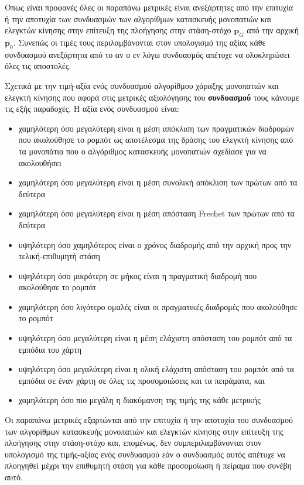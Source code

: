 Όπως είναι προφανές όλες οι παραπάνω μετρικές είναι ανεξάρτητες από την
επιτυχία ή την αποτυχία των συνδυασμών των αλγορίθμων κατασκευής μονοπατιών και
ελεγκτών κίνησης στην επίτευξη της πλοήγησης στην στάση-στόχο $\bm{p}_G$ από
την αρχική $\bm{p}_0$. Συνεπώς οι τιμές τους περιλαμβάνονται στον υπολογισμό
της αξίας κάθε συνδυασμού ανεξάρτητα από το αν ο εν λόγω συνδυασμός απέτυχε
να ολοκληρώσει όλες τις αποστολές.

Σχετικά με την τιμή-αξία ενός συνδυασμού αλγορίθμου χάραξης μονοπατιών και
ελεγκτή κίνησης που αφορά στις μετρικές αξιολόγησης του \textbf{συνδυασμού}
τους κάνουμε τις εξής παραδοχές. Η αξία ενός συνδυασμού είναι:

\begin{itemize}
  \item χαμηλότερη όσο μεγαλύτερη είναι η μέση απόκλιση των πραγματικών
        διαδρομών που ακολούθησε το ρομπότ ως αποτέλεσμα της δράσης του ελεγκτή
        κίνησης από τα μονοπάτια που ο αλγόριθμος κατασκευής μονοπατιών σχεδίασε
        για να ακολουθήσει
  \item χαμηλότερη όσο μεγαλύτερη είναι η μέση συνολική απόκλιση των πρώτων
        από τα δεύτερα
  \item χαμηλότερη όσο μεγαλύτερη είναι η μέση απόσταση Frechet των πρώτων
        από τα δεύτερα
  \item υψηλότερη όσο χαμηλότερος είναι ο χρόνος διαδρομής από την αρχική
        προς την τελική-επιθυμητή στάση
  \item υψηλότερη όσο μικρότερη σε μήκος είναι η πραγματική διαδρομή που
        ακολούθησε το ρομπότ
  \item χαμηλότερη όσο λιγότερο ομαλές είναι οι πραγματικές διαδρομές που
        ακολούθησε το ρομπότ
  \item υψηλότερη όσο μεγαλύτερη είναι η μέση ελάχιστη απόσταση του ρομπότ από
        τα εμπόδια του χάρτη
  \item υψηλότερη όσο μεγαλύτερη είναι η ολική ελάχιστη απόσταση του ρομπότ
        από τα εμπόδια σε έναν χάρτη σε όλες τις προσομοιώσεις και τα πειράματα,
        και
  \item χαμηλότερη όσο πιο μεγάλη η διακύμανση της τιμής της κάθε μετρικής
\end{itemize}

Οι παραπάνω μετρικές εξαρτώνται από την επιτυχία ή την αποτυχία του συνδυασμού
των αλγορίθμων κατασκευής μονοπατιών και ελεγκτών κίνησης στην επίτευξη της
πλοήγησης στην στάση-στόχο και, επομένως, δεν συμπεριλαμβάνονται στον υπολογισμό
της τιμής-αξίας ενός συνδυασμού εάν ο συνδυασμός αυτός απέτυχε να πλοηγηθεί
μέχρι την επιθυμητή στάση για κάθε προσομοίωση ή πείραμα που συνέβη αυτό.
